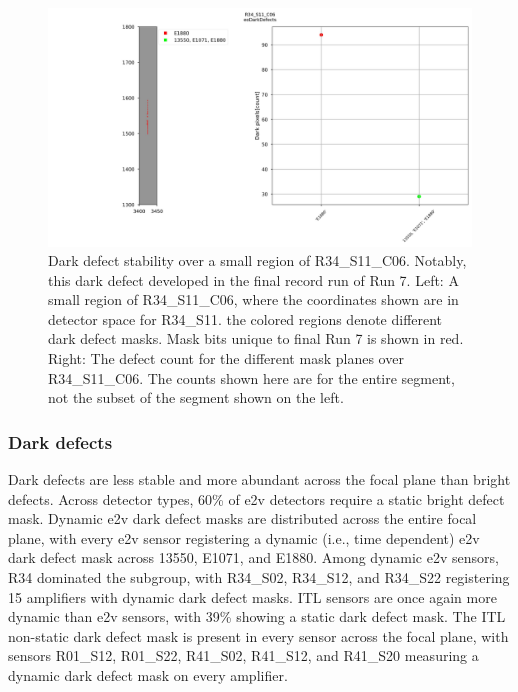 \begin{figure}[ht]
    \centering
    \includegraphics[width=\linewidth]{figures/R34_S11_C06(2).jpg}
    \caption{Dark defect stability over a small region of R34\_S11\_C06. Notably, this dark defect developed in the final record run of Run 7. Left: A small region of R34\_S11\_C06, where the coordinates shown are in detector space for R34\_S11. the colored regions denote different dark defect masks. Mask bits unique to final Run 7 is shown in red. Right: The defect count for the different mask planes over R34\_S11\_C06. The counts shown here are for the entire segment, not the subset of the segment shown on the left.}
    \label{fig:DarkDefectStability}
\end{figure}

\subsubsection{Dark defects}

Dark defects are less stable and more abundant across the focal plane than bright defects. Across detector types, 60\% of e2v detectors require a static bright defect mask. Dynamic e2v dark defect masks are distributed across the entire focal plane, with every e2v sensor registering a dynamic (i.e., time dependent) e2v dark defect mask across 13550, E1071, and E1880. Among dynamic e2v sensors, R34 dominated the subgroup, with R34\_S02, R34\_S12, and R34\_S22 registering 15 amplifiers with dynamic dark defect masks. ITL sensors are once again more dynamic than e2v sensors, with 39\% showing a static dark defect mask. The ITL non-static dark defect mask is present in every sensor across the focal plane, with sensors R01\_S12, R01\_S22, R41\_S02, R41\_S12, and R41\_S20 measuring a dynamic dark defect mask on every amplifier.


